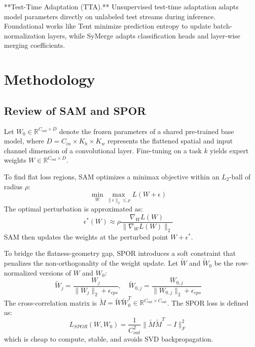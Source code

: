 \documentclass{article}
\theoremstyle{plain}
\theoremstyle{definition}
\theoremstyle{remark}
\begin{document}
**Test-Time Adaptation (TTA).** Unsupervised test-time adaptation adapts model parameters directly on unlabeled test streams during inference. Foundational works like Tent \cite{wang2021tent} minimize prediction entropy to update batch-normalization layers, while SyMerge \cite{jung2025symerge} adapts classification heads and layer-wise merging coefficients.

\section{Methodology}
\label{submission-methodology}

\subsection{Review of SAM and SPOR}
Let $W_0 \in \mathbb{R}^{C_{out} \times D}$ denote the frozen parameters of a shared pre-trained base model, where $D = C_{in} \times K_h \times K_w$ represents the flattened spatial and input channel dimension of a convolutional layer. Fine-tuning on a task $k$ yields expert weights $W \in \mathbb{R}^{C_{out} \times D}$. 

To find flat loss regions, SAM optimizes a minimax objective within an $L_2$-ball of radius $\rho$:
\begin{equation}
    \min_W \max_{\|\epsilon\|_2 \leq \rho} L(W + \epsilon)
\end{equation}
The optimal perturbation is approximated as:
\begin{equation}
    \epsilon^*(W) \approx \rho \frac{\nabla_W L(W)}{\|\nabla_W L(W)\|_2}
\end{equation}
SAM then updates the weights at the perturbed point $W + \epsilon^*$.

To bridge the flatness-geometry gap, SPOR introduces a soft constraint that penalizes the non-orthogonality of the weight update. Let $\tilde{W}$ and $\tilde{W}_0$ be the row-normalized versions of $W$ and $W_0$:
\begin{equation}
    \tilde{W}_j = \frac{W_j}{\|W_j\|_2 + \epsilon_{eps}}, \quad \tilde{W}_{0,j} = \frac{W_{0,j}}{\|W_{0,j}\|_2 + \epsilon_{eps}}
\end{equation}
The cross-correlation matrix is $\tilde{M} = \tilde{W} \tilde{W}_0^T \in \mathbb{R}^{C_{out} \times C_{out}}$. The SPOR loss is defined as:
\begin{equation}
    L_{SPOR}(W, W_0) = \frac{1}{C_{out}^2} \| \tilde{M} \tilde{M}^T - I \|_F^2
\end{equation}
which is cheap to compute, stable, and avoids SVD backpropagation.
\end{document}
